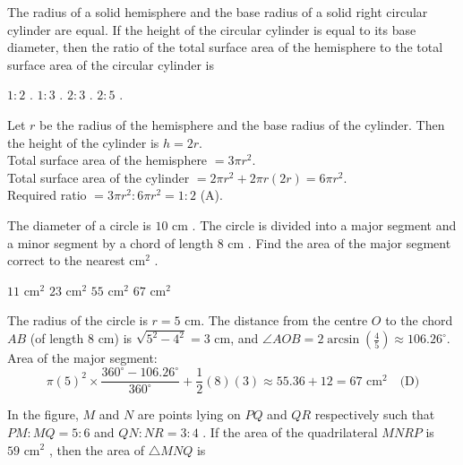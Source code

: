 
\question The radius of a solid hemisphere and the base radius of a solid right circular cylinder are equal. If the height of the circular cylinder is equal to its base diameter, then the ratio of the total surface area of the hemisphere to the total surface area of the circular cylinder is
\begin{choices}
    \correctchoice $1 : 2$ .
    \choice $1 : 3$ .
    \choice $2 : 3$ .
    \choice $2 : 5$ .
\end{choices}
\begin{solution}
Let $r$ be the radius of the hemisphere and the base radius of the cylinder. Then the height of the cylinder is $h = 2r$. \\
Total surface area of the hemisphere $= 3\pi r^2$. \\
Total surface area of the cylinder $= 2\pi r^2 + 2\pi r(2r) = 6\pi r^2$. \\
Required ratio $= 3\pi r^2 : 6\pi r^2 = 1 : 2$ (A).
\end{solution}

\question The diameter of a circle is $10\text{ cm}$ . The circle is divided into a major segment and a minor segment by a chord of length $8\text{ cm}$ . Find the area of the major segment correct to the nearest $\text{cm}^2$ .
\begin{choices}
    \choice $11\text{ cm}^2$
    \choice $23\text{ cm}^2$
    \choice $55\text{ cm}^2$
    \correctchoice $67\text{ cm}^2$
\end{choices}
\begin{solution}
The radius of the circle is $r = 5\text{ cm}$. The distance from the centre $O$ to the chord $AB$ (of length $8\text{ cm}$) is $\sqrt{5^2 - 4^2} = 3\text{ cm}$, and $\angle AOB = 2\arcsin\left(\frac{4}{5}\right) \approx 106.26^\circ$. \\
Area of the major segment:
\[ \pi(5)^2 \times \frac{360^\circ - 106.26^\circ}{360^\circ} + \frac{1}{2}(8)(3) \approx 55.36 + 12 = 67\text{ cm}^2 \quad \text{(D)} \]
\end{solution}

\question In the figure, $M$ and $N$ are points lying on $PQ$ and $QR$ respectively such that $PM : MQ = 5 : 6$ and $QN : NR = 3 : 4$ . If the area of the quadrilateral $MNRP$ is $59\text{ cm}^2$ , then the area of $\triangle MNQ$ is

